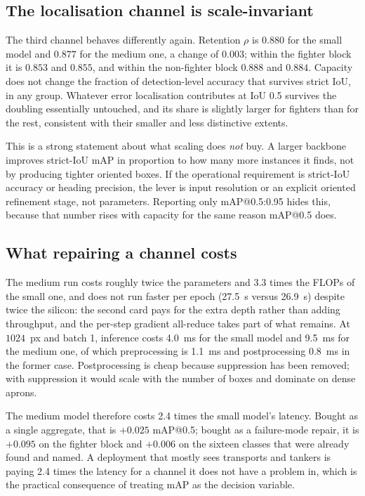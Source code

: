 \documentclass[conference]{IEEEtran}
\begin{document}
\subsection{The localisation channel is scale-invariant}
The third channel behaves differently again. Retention $\rho$ is $0.880$ for the
small model and $0.877$ for the medium one, a change of $0.003$; within the
fighter block it is $0.853$ and $0.855$, and within the non-fighter block $0.888$
and $0.884$. Capacity does not change the fraction of detection-level accuracy
that survives strict IoU, in any group. Whatever error localisation contributes
at IoU 0.5 survives the doubling essentially untouched, and its share is
slightly larger for fighters than for the rest, consistent with their smaller
and less distinctive extents.

This is a strong statement about what scaling does \emph{not} buy. A larger
backbone improves strict-IoU mAP in proportion to how many more instances it
finds, not by producing tighter oriented boxes. If the operational requirement is
strict-IoU accuracy or heading precision, the lever is input resolution or an
explicit oriented refinement stage, not parameters. Reporting only
mAP@0.5:0.95 hides this, because that number rises with capacity for the same
reason mAP@0.5 does.

\subsection{What repairing a channel costs}
The medium run costs roughly twice the parameters and 3.3 times the FLOPs of the
small one, and does not run faster per epoch (27.5~s versus 26.9~s) despite
twice the silicon: the second card pays for the extra depth rather than adding
throughput, and the per-step gradient all-reduce takes part of what remains. At
$1024$~px and batch 1, inference costs 4.0~ms for the small model and 9.5~ms for
the medium one, of which preprocessing is 1.1~ms and postprocessing 0.8~ms in
the former case. Postprocessing is cheap because suppression has been removed;
with suppression it would scale with the number of boxes and dominate on dense
aprons.

The medium model therefore costs 2.4 times the small model's latency. Bought as
a single aggregate, that is $+0.025$ mAP@0.5; bought as a failure-mode repair,
it is $+0.095$ on the fighter block and $+0.006$ on the sixteen classes that
were already found and named. A deployment that mostly sees transports and
tankers is paying 2.4 times the latency for a channel it does not have a problem
in, which is the practical consequence of treating mAP as the decision variable.
\end{document}
